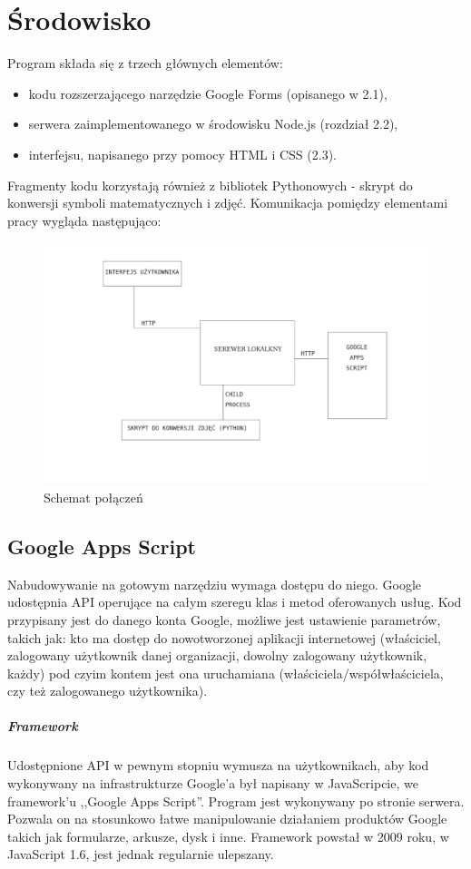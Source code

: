 \chapter{Środowisko} 
Program składa się z trzech głównych elementów:
\begin{itemize}
\item kodu rozszerzającego narzędzie Google Forms (opisanego w 2.1),
\item serwera zaimplementowanego w środowisku Node.js (rozdział 2.2),
\item interfejsu, napisanego przy pomocy HTML i CSS (2.3).
\end{itemize}
\ind Fragmenty kodu korzystają również z bibliotek Pythonowych - skrypt do konwersji symboli matematycznych i zdjęć.
\ind Komunikacja pomiędzy elementami pracy wygląda następująco:
\begin{figure}[H]
  \includegraphics{schemat.png}
  \caption{Schemat połączeń}
  \label{fig:1}
\end{figure}

\section{Google Apps Script}
Nabudowywanie na gotowym narzędziu wymaga dostępu do niego. Google udostępnia API operujące na całym szeregu klas i metod oferowanych usług. Kod przypisany jest do danego konta Google, możliwe jest ustawienie parametrów,  takich  jak: kto ma dostęp do nowotworzonej aplikacji internetowej (właściciel, zalogowany użytkownik danej organizacji, dowolny zalogowany użytkownik, każdy) pod czyim kontem jest ona uruchamiana (właściciela/współwłaściciela, czy też zalogowanego użytkownika). 

\paragraph{Framework}
Udostępnione API w pewnym stopniu wymusza na użytkownikach, aby kod wykonywany na infrastrukturze Google'a był napisany w JavaScripcie, we framework'u ,,Google Apps Script''. Program jest wykonywany po stronie serwera. Pozwala on na stosunkowo łatwe manipulowanie działaniem produktów Google takich jak formularze, arkusze, dysk i inne. 
\ind Framework powstał w 2009 roku, w JavaScript 1.6, jest jednak regularnie ulepszany.

